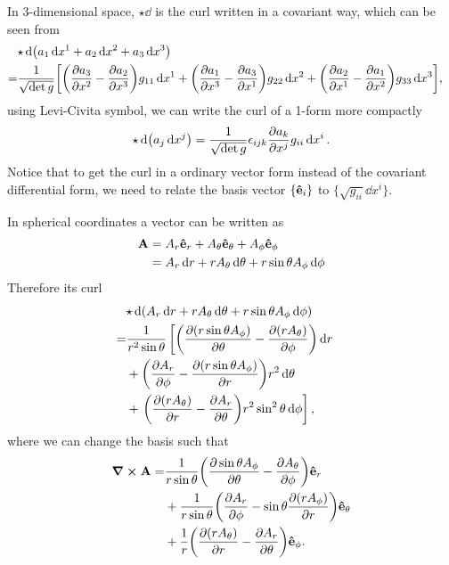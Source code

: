 \documentclass[10pt]{article}
\begin{document}
	In 3-dimensional space, $\star\dd$ is the curl written in a covariant way, which can be seen from
	\begin{align*}
		\lefteqn{\star \dd(a_1 \dd{x^1} + a_2 \dd{x^2} + a_3 \dd{x^3})} \\
		=& \frac{1}{\sqrt{\det g}} \qty[\qty(\pdv{a_3}{x^2} - \pdv{a_2}{x^3}) g_{11} \dd{x^1} + \qty(\pdv{a_1}{x^3} - \pdv{a_3}{x^1}) g_{22} \dd{x^2} + \qty(\pdv{a_2}{x^1} - \pdv{a_1}{x^2}) g_{33} \dd{x^3}],
	\end{align*}
	using Levi-Civita symbol, we can write the curl of a 1-form more compactly
	\begin{equation}
		\star \dd(a_j \dd{x^j}) = \frac{1}{\sqrt{\det g}} \epsilon_{ijk} \pdv{a_k}{x^j} g_{ii} \dd{x^i}.
	\end{equation}
	Notice that to get the curl in a ordinary vector form instead of the covariant differential form, we need to relate the basis vector $\{ \vu{e}_i \}$ to $\{ \sqrt{g_{ii}} \dd{x^i} \}$.
	\begin{example}
		In spherical coordinates a vector can be written as
		\begin{align*}
			{\bf A} &= A_r \vu{e}_r + A_{\theta} \vu{e}_{\theta} + A_{\phi} \vu{e}_{\phi} \\
			&= A_r \dd{r} + r A_{\theta} \dd{\theta} + r \sin{\theta} A_{\phi} \dd{\phi}
		\end{align*}
		Therefore its curl
		\begin{align*}
			\lefteqn{\star \dd(A_r \dd{r} + r A_{\theta} \dd{\theta} + r \sin{\theta} A_{\phi} \dd{\phi})} \\
			=& \frac{1}{r^2 \sin{\theta}}  \left[\pqty{\pdv{(r \sin{\theta} A_{\phi})}{\theta} - \pdv{(r A_{\theta})}{\phi}} \dd{r} \right. \\
			&+ \pqty{\pdv{A_r}{\phi} - \pdv{(r \sin{\theta} A_{\phi})}{r}} r^2 \dd{\theta} \\
			&+ \left. \pqty{\pdv{(r A_{\theta})}{r} - \pdv{A_r}{\theta}} r^2 \sin^2{\theta} \dd{\phi} \right],
		\end{align*}
		where we can change the basis such that
		\begin{align*}
			\curl{\bfA} =& \frac{1}{r \sin{\theta}} \pqty{\pdv{ \sin{\theta} A_{\phi}}{\theta} - \pdv{ A_{\theta}}{\phi}} \vu{e}_{r} \\
			&+ \frac{1}{r \sin{\theta}} \pqty{\pdv{A_r}{\phi} - \sin{\theta} \pdv{(r A_{\phi})}{r}} \vu{e}_{\theta} \\
			&+ \frac{1}{r} \pqty{\pdv{(r A_{\theta})}{r} - \pdv{A_r}{\theta}} \vu{e}_{\phi}.
		\end{align*}
	\end{example}
\end{document}
